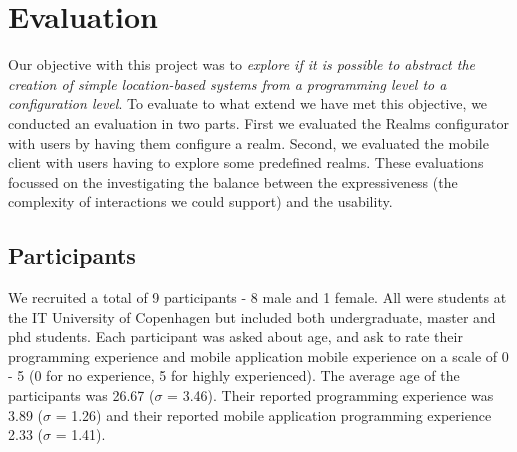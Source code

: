 \section{Evaluation}
\label{sec.eval}
Our objective with this project was to \emph{explore if it is possible to abstract the creation of simple location-based systems from a programming level to a configuration level}. To evaluate to what extend we have met this objective, we conducted an evaluation in two parts. First we evaluated the Realms configurator with users by having them configure a realm. Second, we evaluated the mobile client with users having to explore some predefined realms. These evaluations focussed on the investigating the balance between the expressiveness (the complexity of interactions we could support) and the usability.

\subsection{Participants} %
\label{sub:participants}
We recruited a total of 9 participants - 8 male and 1 female. All were students at the IT University of Copenhagen but included both undergraduate, master and phd students. Each participant was asked about age, and ask to rate their programming experience and mobile application mobile experience on a scale of 0 - 5 (0 for no experience, 5 for highly experienced). The average age of the participants was 26.67 ($\sigma$ = 3.46). Their reported programming experience was 3.89 ($\sigma$ = 1.26) and their reported mobile application programming experience 2.33 ($\sigma$ =  1.41). 


